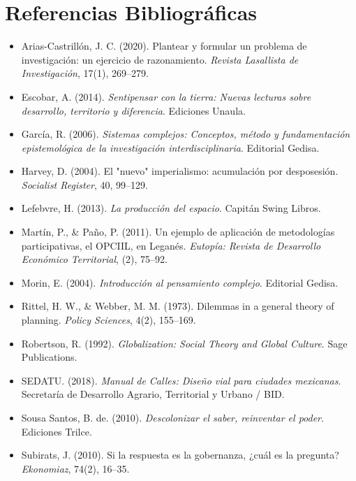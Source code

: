 \documentclass[12pt,a4paper]{article}
\begin{document}
\section*{Referencias Bibliográficas}

\begin{itemize}[leftmargin=*]
    \item Arias-Castrillón, J. C. (2020). Plantear y formular un problema de investigación: un ejercicio de razonamiento. \textit{Revista Lasallista de Investigación}, 17(1), 269--279.
    \item Escobar, A. (2014). \textit{Sentipensar con la tierra: Nuevas lecturas sobre desarrollo, territorio y diferencia}. Ediciones Unaula.
    \item García, R. (2006). \textit{Sistemas complejos: Conceptos, método y fundamentación epistemológica de la investigación interdisciplinaria}. Editorial Gedisa.
    \item Harvey, D. (2004). El "nuevo" imperialismo: acumulación por desposesión. \textit{Socialist Register}, 40, 99--129.
    \item Lefebvre, H. (2013). \textit{La producción del espacio}. Capitán Swing Libros.
    \item Martín, P., \& Paño, P. (2011). Un ejemplo de aplicación de metodologías participativas, el OPCIIL, en Leganés. \textit{Eutopía: Revista de Desarrollo Económico Territorial}, (2), 75--92.
    \item Morin, E. (2004). \textit{Introducción al pensamiento complejo}. Editorial Gedisa.
    \item Rittel, H. W., \& Webber, M. M. (1973). Dilemmas in a general theory of planning. \textit{Policy Sciences}, 4(2), 155--169.
    \item Robertson, R. (1992). \textit{Globalization: Social Theory and Global Culture}. Sage Publications.
    \item SEDATU. (2018). \textit{Manual de Calles: Diseño vial para ciudades mexicanas}. Secretaría de Desarrollo Agrario, Territorial y Urbano / BID.
    \item Sousa Santos, B. de. (2010). \textit{Descolonizar el saber, reinventar el poder}. Ediciones Trilce.
    \item Subirats, J. (2010). Si la respuesta es la gobernanza, ¿cuál es la pregunta? \textit{Ekonomiaz}, 74(2), 16--35.
\end{itemize}
\end{document}

